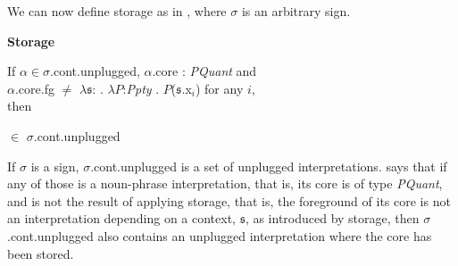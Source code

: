 We can now define storage as in
\nexteg{}, where $\sigma$ is an arbitrary sign.
\begin{ex} 
\textbf{Storage}

If $\alpha\in\sigma$.cont.unplugged, $\alpha$.core : \textit{PQuant}
and \\ $\alpha$.core.fg $\not=$
$\lambda\mathfrak{s}$:
  . $\lambda P$:\textit{Ppty} . $P$($\mathfrak{s}$.x$_i$) for any $i$, \\then

\hspace*{1em}

\hspace*{4em}$\in$ $\sigma$.cont.unplugged
                                 
\end{ex} 
If $\sigma$ is a sign, $\sigma$.cont.unplugged is a set of unplugged interpretations.
\preveg{} says that if any
of those is a noun-phrase interpretation, that is, its core is of type
\textit{PQuant}, and is not the result of applying storage, that is,
the foreground of its core is not an interpretation depending on a
context, $\mathfrak{s}$, as introduced by storage, then
$\sigma$.cont.unplugged also contains an unplugged interpretation
where the core has been stored. 

